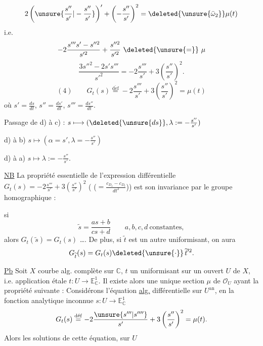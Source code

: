 \[
2\left(\unsure{\frac{s''}{s'}|-\frac{s''}{s'}}\right)'+\left(-\frac{s''}{s'}\right)^2=\deleted{\unsure{\bar\omega_2}}\mu(t)
\]
i.e.
\[
-2\frac{s'''s'-s''^2}{s'^2}+\frac{s''^2}{s'^2}\ \deleted{\unsure{=}}\ \mu
\]
\[
\frac{3s''^2-2s's'''}{s'^2}=-2\frac{s'''}{s'}+3\left(\frac{s''}{s'}\right)^2.
\]
\[
(4)\qquad\boxed{G_t(s)\overset{\mathrm{d\acute ef}}{=}-2\frac{s'''}{s'}+3\left(\frac{s''}{s'}\right)^2=\mu(t)}
\]
où $s'=\frac{ds}{dt}$, $s''=\frac{ds'}{dt}$, $s'''=\frac{ds''}{dt}$.

Passage de d) à c) : $s\longmapsto(\deleted{\unsure{ds}},\lambda:=-\frac{s''}{s'})$

\unsure{---} d) à b) $s\longmapsto(\alpha=s',\lambda=-\frac{s''}{s'})$

\unsure{---} d) à a) $s\longmapsto\lambda:=-\frac{s''}{s'}$.

\uline{NB} La propriété essentielle de l'expression différentielle $G_t(s)=-2\frac{s'''}{s'}+3(\frac{s''}{s'})^2$  ( ($=\frac{c_{D_s}-c_{D_t}}{dt^2}$)) est son invariance par le groupe homographique :

si 
\[
\widetilde s=\frac{as+b}{cs+d}\qquad a,b,c,d\ \text{constantes},
\]
alors $G_t(\widetilde s)=G_t(s)$ \ldots. De plus, si $\widetilde t$ est un autre uniformisant, on aura
\[
G_{\widetilde t}(s)=G_t(s)\deleted{\unsure{\cdot}}\,\widetilde t'^2.
\]

\uline{Pb} Soit $X$ courbe alg. complète sur $\mathbb C$, $t$ un uniformisant sur un ouvert $U$ de $X$, i.e. application étale $t:U\longrightarrow\mathbb E^1_{\mathbb C}$. Il existe alors une unique section $\mu$ de $\mathcal O_U$ ayant la propriété suivante : Considérons l'équation \uline{alg.} différentielle sur $U^{\mathrm{an}}$, en la fonction analytique inconnue $s:U\longrightarrow\mathbb E^1_{\mathbb C}$
\[
G_t(s)\overset{\mathrm{d\acute ef}}{=}-2\frac{\unsure{s'''|s''''}}{s'}+3\left(\frac{s''}{s'}\right)^2=\mu(t).
\]
Alors les solutions de cette équation, sur $U$
